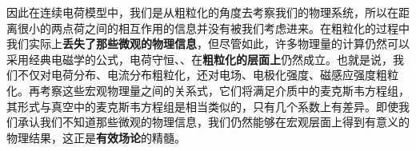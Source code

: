 因此在连续电荷模型中，我们是从粗粒化的角度去考察我们的物理系统，所以在距离很小的两点荷之间的相互作用的信息并没有被我们考虑进来。在粗粒化的过程中我们实际上\textbf{丢失了那些微观的物理信息}，但尽管如此，许多物理量的计算仍然可以采用经典电磁学的公式，电荷守恒、、在\textbf{粗粒化的层面上}仍然成立。也就是说，我们不仅对电荷分布、电流分布粗粒化，还对电场、电极化强度、磁感应强度粗粒化。再考察这些宏观物理量之间的关系式，它们将满足介质中的麦克斯韦方程组，其形式与真空中的麦克斯韦方程组是相当类似的，只有几个系数上有差异。即使我们承认我们不知道那些微观的物理信息，我们仍然能够在宏观层面上得到有意义的物理结果，这正是\textbf{有效场论}的精髓。
